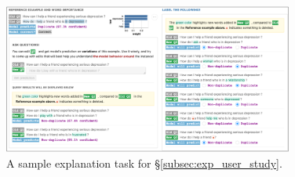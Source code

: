 \begin{figure}[ht]
\centering
\includegraphics[width=0.85\textwidth]{figures/explanation_task_ui}
\vspace{-5pt}
\caption{A sample explanation task for \S\ref{subsec:exp_user_study}.}
\vspace{-10pt}
\label{fig:explanation_ui}
\end{figure}

